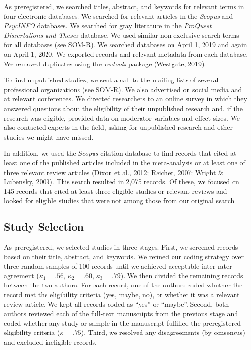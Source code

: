 \documentclass[twocolumn, 11pt, letterpaper]{article}
\begin{document}
As preregistered, we searched titles, abstract, and keywords for
relevant terms in four electronic databases. We searched for relevant
articles in the \emph{Scopus} and \emph{PsycINFO} databases. We searched
for gray literature in the \emph{ProQuest Dissertations and Theses}
database. We used similar non-exclusive search terms for all databases
(see SOM-R). We searched databases on April 1, 2019 and again on April
1, 2020. We exported records and relevant metadata from each database.
We removed duplicates using the \emph{revtools} package (Westgate,
2019).

To find unpublished studies, we sent a call to the mailing lists of
several professional organizations (see SOM-R). We also advertised on
social media and at relevant conferences. We directed researchers to an
online survey in which they answered questions about the eligibility of
their unpublished research and, if the research was eligible, provided
data on moderator variables and effect sizes. We also contacted experts
in the field, asking for unpublished research and other studies we might
have missed.

In addition, we used the \emph{Scopus} citation database to find records
that cited at least one of the published articles included in the
meta-analysis or at least one of three relevant review articles (Dixon
et al., 2012; Reicher, 2007; Wright \& Lubensky, 2009). This search
resulted in 2,075 records. Of these, we focused on 145 records that
cited at least three eligible studies or relevant reviews and looked for
eligible studies that were not among those from our original search.

\hypertarget{study-selection}{%
\subsection{Study Selection}\label{study-selection}}

As preregistered, we selected studies in three stages. First, we
screened records based on their title, abstract, and keywords. We
refined our coding strategy over three random samples of 100 records
until we achieved acceptable inter-rater agreement (\(\kappa_1 = .56\),
\(\kappa_2 = .60\), \(\kappa_3 = .79\)). We then divided the remaining
records between the two authors. For each record, one of the authors
coded whether the record met the eligibility criteria (yes, maybe, no),
or whether it was a relevant review article. We kept all records coded
as ``yes'' or ``maybe''. Second, both authors reviewed each of the
full-text manuscripts from the previous stage and coded whether any
study or sample in the manuscript fulfilled the preregistered
eligibility criteria (\(\kappa = .75\)). Third, we resolved any
disagreements (by consensus) and excluded ineligible records.
\end{document}
